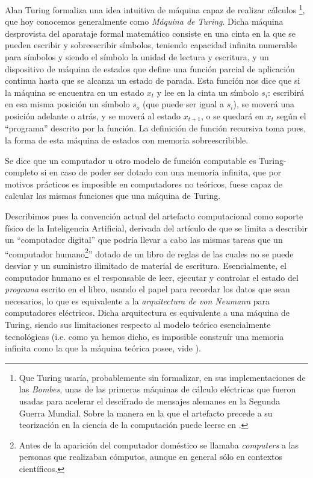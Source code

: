 \documentclass[12pt]{memoir}
\begin{document}
Alan Turing formaliza \parencite{turingComputableNumbers} una idea intuitiva de máquina capaz de realizar cálculos \footnote{Que Turing usaría, probablemente sin formalizar, en sus implementaciones de las \textit{Bombes}, unas de las primeras máquinas de cálculo eléctricas que fueron usadas para acelerar el descifrado de mensajes alemanes en la Segunda Guerra Mundial. Sobre la manera en la que el artefacto precede a su teorización en la ciencia de la computación puede leerse en \parencite[apartado 1]{alonso}.}, que hoy conocemos generalmente como \textit{Máquina de Turing}. Dicha máquina desprovista del aparataje formal matemático consiste en una cinta en la que se pueden escribir y sobreescribir símbolos, teniendo capacidad infinita numerable para símbolos y siendo el símbolo la unidad de lectura y escritura, y un dispositivo de máquina de estados que define una función parcial de aplicación continua hasta que se alcanza un estado de parada. Esta función nos dice que si la máquina se encuentra en un estado $x_{t}$ y lee en la cinta un símbolo $s_i$: escribirá en esa misma posición un símbolo $s_o$ (que puede ser igual a $s_i$), se moverá una posición adelante o atrás, y se moverá al estado $x_{t+1}$, o se quedará en $x_{t}$ según el ``programa'' descrito por la función. La definición de función recursiva toma pues, la forma de esta máquina de estados con memoria sobreescribible. 

Se dice que un computador u otro modelo de función computable es Turing-completo si en caso de poder ser dotado con una memoria infinita, que por motivos prácticos es imposible en computadores no teóricos, fuese capaz de calcular las mismas funciones que una máquina de Turing.

Describimos pues la convención actual del artefacto computacional como soporte físico de la Inteligencia Artificial, derivada del artículo de \cite[apartados 4 y 5]{Turing1950cmi} que se limita a describir un ``computador digital'' que podría llevar a cabo las mismas tareas que un ``computador humano\footnote{Antes de la aparición del computador doméstico se llamaba \textit{computers} a las personas que realizaban cómputos, aunque en general sólo en contextos científicos.}'' dotado de un libro de reglas de las cuales no se puede desviar y un suministro ilimitado de material de escritura. Esencialmente, el computador humano es el responsable de leer, ejecutar y controlar el estado del \textit{programa} escrito en el libro, usando el papel para recordar los datos que sean necesarios, lo que es equivalente a la \textit{arquitectura de von Neumann} para computadores eléctricos. Dicha arquitectura es equivalente a una máquina de Turing, siendo sus limitaciones respecto al modelo teórico esencialmente tecnológicas (i.e. como ya hemos dicho, es imposible construír una memoria infinita como la que la máquina teórica posee, vide \cite[apartado 4]{Turing1950cmi}).
\end{document}
